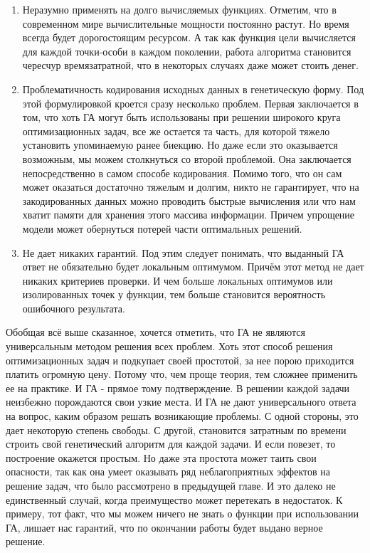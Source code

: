 \begin{enumerate}
\item Неразумно применять на долго вычисляемых функциях. Отметим, что в современном мире вычислительные мощности постоянно растут. Но время всегда будет дорогостоящим ресурсом. А так как функция цели вычисляется для каждой точки-особи в каждом поколении, работа алгоритма становится чересчур времязатратной, что в некоторых случаях даже может стоить денег.
\item Проблематичность кодирования исходных данных в генетическую форму. Под этой формулировкой кроется сразу несколько проблем. Первая заключается в том, что хоть ГА могут быть использованы при решении широкого круга оптимизационных задач, все же остается та часть, для которой тяжело установить упоминаемую ранее биекцию. Но даже если это оказывается возможным, мы можем столкнуться со второй проблемой. Она заключается непосредственно в самом способе кодирования. Помимо того, что он сам может оказаться достаточно тяжелым и долгим, никто не гарантирует, что на закодированных данных можно проводить быстрые вычисления или что нам хватит памяти для хранения этого массива информации. Причем упрощение модели может обернуться потерей части оптимальных решений.
\item Не дает никаких гарантий. Под этим следует понимать, что выданный ГА ответ не обязательно будет локальным оптимумом. Причём этот метод не дает никаких критериев проверки. И чем больше локальных оптимумов или изолированных точек у функции, тем больше становится вероятность ошибочного результата.
\end{enumerate}
Обобщая всё выше сказанное, хочется отметить, что ГА не являются универсальным методом решения всех проблем. Хоть этот способ решения оптимизационных задач и подкупает своей простотой, за нее порою приходится платить огромную цену. Потому что, чем проще теория, тем сложнее применить ее на практике. И ГА - прямое тому подтверждение. В решении каждой задачи неизбежно порождаются свои узкие места. И ГА не дают универсального ответа на вопрос, каким образом решать возникающие проблемы. С одной стороны, это дает некоторую степень свободы. С другой, становится затратным по времени строить свой генетический алгоритм для каждой задачи. И если повезет, то построение окажется простым. Но даже эта простота может таить свои опасности, так как она умеет оказывать ряд неблагоприятных эффектов на решение задач, что было рассмотрено в предыдущей главе. И это далеко не единственный случай, когда преимущество может перетекать в недостаток. К примеру, тот факт, что мы можем ничего не знать о функции при использовании ГА, лишает нас гарантий, что по окончании работы будет выдано верное решение.

